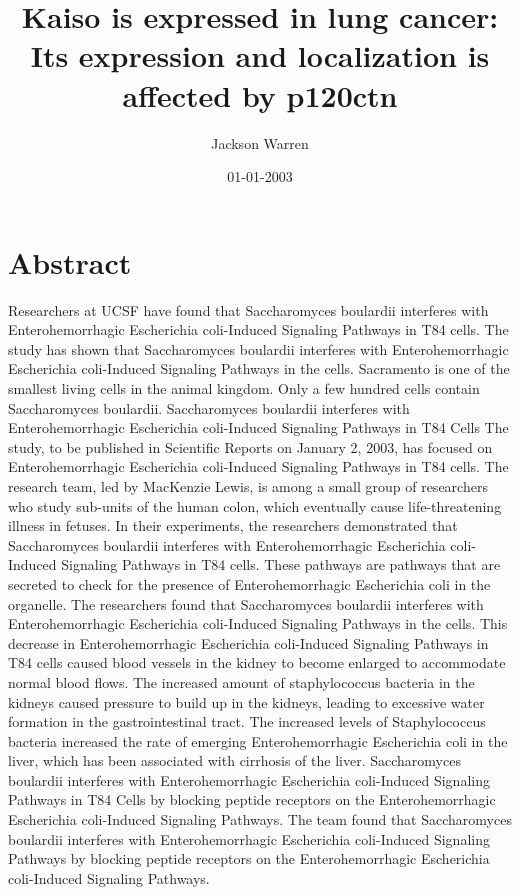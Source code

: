 \documentclass{article}%
\title{Kaiso is expressed in lung cancer: Its expression and localization is affected by p120ctn}%
\author{Jackson Warren}%
\affil{Stem Cell and Tissue Engineering Department, Research Center for Science and Technology in Medicine (RCSTiM), Tehran University of Medical Sciences, Tehran, Iran}%
\date{01{-}01{-}2003}%
\begin{document}
%
\normalsize%
\maketitle%
\section{Abstract}%
\label{sec:Abstract}%
Researchers at UCSF have found that Saccharomyces boulardii interferes with Enterohemorrhagic Escherichia coli{-}Induced Signaling Pathways in T84 cells. The study has shown that Saccharomyces boulardii interferes with Enterohemorrhagic Escherichia coli{-}Induced Signaling Pathways in the cells. Sacramento is one of the smallest living cells in the animal kingdom. Only a few hundred cells contain Saccharomyces boulardii. Saccharomyces boulardii interferes with Enterohemorrhagic Escherichia coli{-}Induced Signaling Pathways in T84 Cells\newline%
The study, to be published in Scientific Reports on January 2, 2003, has focused on Enterohemorrhagic Escherichia coli{-}Induced Signaling Pathways in T84 cells. The research team, led by MacKenzie Lewis, is among a small group of researchers who study sub{-}units of the human colon, which eventually cause life{-}threatening illness in fetuses.\newline%
In their experiments, the researchers demonstrated that Saccharomyces boulardii interferes with Enterohemorrhagic Escherichia coli{-}Induced Signaling Pathways in T84 cells. These pathways are pathways that are secreted to check for the presence of Enterohemorrhagic Escherichia coli in the organelle. The researchers found that Saccharomyces boulardii interferes with Enterohemorrhagic Escherichia coli{-}Induced Signaling Pathways in the cells. This decrease in Enterohemorrhagic Escherichia coli{-}Induced Signaling Pathways in T84 cells caused blood vessels in the kidney to become enlarged to accommodate normal blood flows. The increased amount of staphylococcus bacteria in the kidneys caused pressure to build up in the kidneys, leading to excessive water formation in the gastrointestinal tract. The increased levels of Staphylococcus bacteria increased the rate of emerging Enterohemorrhagic Escherichia coli in the liver, which has been associated with cirrhosis of the liver.\newline%
Saccharomyces boulardii interferes with Enterohemorrhagic Escherichia coli{-}Induced Signaling Pathways in T84 Cells by blocking peptide receptors on the Enterohemorrhagic Escherichia coli{-}Induced Signaling Pathways. The team found that Saccharomyces boulardii interferes with Enterohemorrhagic Escherichia coli{-}Induced Signaling Pathways by blocking peptide receptors on the Enterohemorrhagic Escherichia coli{-}Induced Signaling Pathways.\newline%
\end{document}
